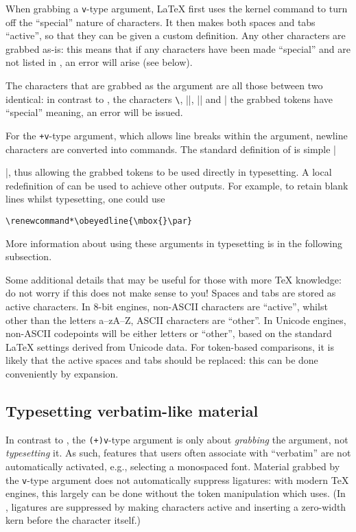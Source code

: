 \documentclass{ltxguide}
\begin{document}
When grabbing a \texttt{v}-type argument, \LaTeX{} first uses the kernel
command  to turn off the \enquote{special} nature of characters.
It then makes both spaces and tabs \enquote{active}, so that they can be given
a custom definition. Any other characters are grabbed as-is: this means that if
any characters have been made \enquote{special} and are not listed in
, an error will arise (see below).

The characters that are grabbed as the argument are all those between two
identical: in contrast to , the characters \texttt{\textbackslash},
|{|, |}| and |%
the grabbed tokens have \enquote{special} meaning, an error will be issued.

For the \texttt{+v}-type argument, which allows line breaks within the
argument, newline characters are converted into  commands. The
standard definition of  is simple |\par|, thus allowing the
grabbed tokens to be used directly in typesetting. A local redefinition of
 can be used to achieve other outputs. For example, to retain
blank lines whilst typesetting, one could use
\begin{verbatim}
\renewcommand*\obeyedline{\mbox{}\par}
\end{verbatim}
More information about using these arguments in typesetting is in the following
subsection.

Some additional details that may be useful for those with more \TeX{}
knowledge: do not worry if this does not make sense to you! Spaces and tabs are
stored as active characters. In $8$-bit engines, non-ASCII characters are
\enquote{active}, whilst other than the letters a--zA--Z, ASCII characters are
\enquote{other}. In Unicode engines, non-ASCII codepoints will be either
letters or \enquote{other}, based on the standard \LaTeX{} settings derived
from Unicode data. For token-based comparisons, it is likely that the active
spaces and tabs should be replaced: this can be done conveniently by expansion.

\subsection{Typesetting verbatim-like material}

In contrast to , the \texttt{(+)v}-type argument is only about
\emph{grabbing} the argument, not \emph{typesetting} it. As such, features that
users often associate with \enquote{verbatim} are not automatically activated,
e.g., selecting a monospaced font. Material grabbed by the \texttt{v}-type
argument does not automatically suppress ligatures: with modern \TeX{} engines,
this largely can be done without the token manipulation which  uses.
(In , ligatures are suppressed by making characters active and
inserting a zero-width kern before the character itself.)
\end{document}

